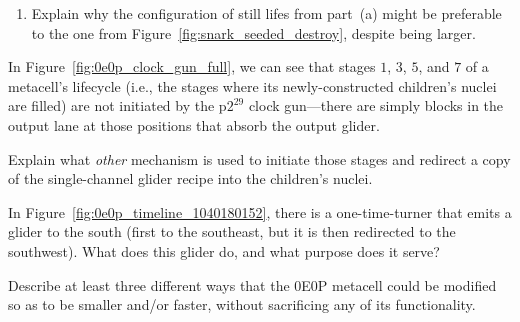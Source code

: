 \begin{multicols}{2}
\begin{problemstar}
\begin{enumerate}[label=\bf\color{ocre}(\alph*)]
			\item Explain why the configuration of still lifes from part~(a) might be preferable to the one from Figure~\ref{fig:snark_seeded_destroy}, despite being larger.
		\end{enumerate}
	\end{problemstar}


	\mfilbreak
	
	
	\begin{problem}\label{exer:0e0p_why_blocks_clock_lane} 
		In Figure~\ref{fig:0e0p_clock_gun_full}, we can see that stages $1$, $3$, $5$, and $7$ of a metacell's lifecycle (i.e., the stages where its newly-constructed children's nuclei are filled) are not initiated by the p$2^{29}$ clock gun---there are simply blocks in the output lane at those positions that absorb the output glider.
		
		\noindent Explain what \emph{other} mechanism is used to initiate those stages and redirect a copy of the single-channel glider recipe into the children's nuclei.
	\end{problem}


	\mfilbreak
	
	
	\begin{problemstar}\label{exer:0e0p_extra_south_glider} 
		In Figure~\ref{fig:0e0p_timeline_1040180152}, there is a one-time-turner that emits a glider to the south (first to the southeast, but it is then redirected to the southwest). What does this glider do, and what purpose does it serve?
	\end{problemstar}


	\mfilbreak
	
	
	\begin{problem}\label{exer:0e0p_how_make_faster} 
		Describe at least three different ways that the 0E0P metacell could be modified so as to be smaller and/or faster, without sacrificing any of its functionality.
	\end{problem}
	
	
\end{multicols}
\normalsize\vspace*{0.01cm}
